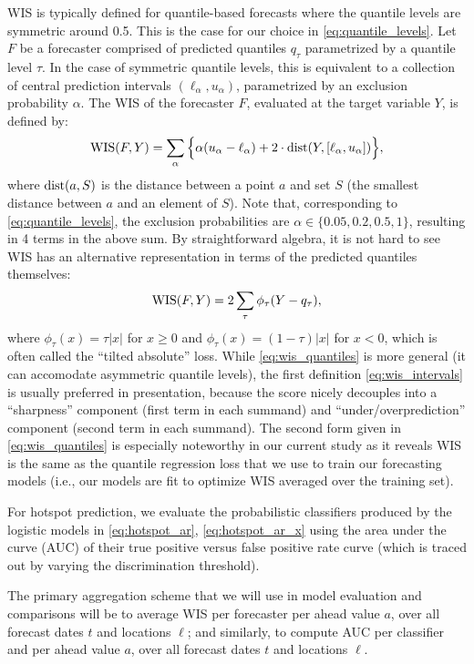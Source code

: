 \documentclass[9pt,twocolumn,twoside,lineno]{pnas-new}
\begin{document}
WIS is typically defined for quantile-based forecasts where the quantile levels
are symmetric around 0.5.  This is the case for our choice in
\eqref{eq:quantile_levels}.  Let $F$ be a forecaster comprised of predicted
quantiles $q_\tau$ parametrized by a quantile level $\tau$.  In the case of
symmetric quantile levels, this is equivalent to a collection of central
prediction intervals $(\ell_\alpha, u_\alpha)$, parametrized by an exclusion
probability $\alpha$. The WIS of the forecaster $F$, evaluated at the target
variable $Y$, is defined by:
\begin{equation}
\label{eq:wis_intervals}
\mathrm{WIS}(F,Y) = \sum_\alpha \Big\{\alpha(u_\alpha - \ell_\alpha) + 2 \cdot
\mathrm{dist}(Y, [\ell_\alpha, u_\alpha])\Big\},  
\end{equation}
where $\mathrm{dist}(a, S)$ is the distance between a point $a$ and set $S$ (the
smallest distance between $a$ and an element of $S$).  Note that, corresponding 
to \eqref{eq:quantile_levels}, the exclusion probabilities are $\alpha \in
\{0.05, 0.2, 0.5, 1\}$, resulting in 4 terms in the above sum.  By 
straightforward algebra, it is not hard to see WIS has an alternative 
representation in terms of the predicted quantiles themselves:
\begin{equation}
\label{eq:wis_quantiles}
\mathrm{WIS}(F,Y) = 2 \sum_\tau \phi_\tau(Y - q_\tau), 
\end{equation}
where $\phi_\tau(x) = \tau |x|$ for $x \geq 0$ and $\phi_\tau(x) = (1-\tau)
|x|$ for $x<0$, which is often called the ``tilted absolute'' loss.  While
\eqref{eq:wis_quantiles} is more general (it can accomodate asymmetric quantile
levels), the first definition \eqref{eq:wis_intervals} is usually preferred in
presentation, because the score nicely decouples into a ``sharpness'' component
(first term in each summand) and ``under/overprediction'' component (second term
in each summand).  The second form given in \eqref{eq:wis_quantiles} is
especially noteworthy in our current study as it reveals WIS is the same as the
quantile regression loss that we use to train our forecasting models (i.e., our
models are fit to optimize WIS averaged over the training set).    

For hotspot prediction, we evaluate the probabilistic classifiers produced by
the logistic models in \eqref{eq:hotspot_ar}, \eqref{eq:hotspot_ar_x} using the 
area under the curve (AUC) of their true positive versus false positive rate
curve (which is traced out by varying the discrimination threshold). 

The primary aggregation scheme that we will use in model evaluation and
comparisons will be to average WIS per forecaster per ahead value $a$, over all
forecast dates $t$ and locations $\ell$; and similarly, to compute AUC per
classifier and per ahead value $a$, over all forecast dates $t$ and locations
$\ell$.
\end{document}
